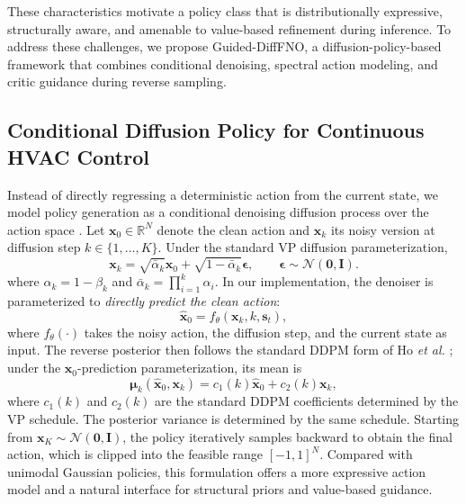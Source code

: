\documentclass[lettersize,journal]{IEEEtran}
\theoremstyle{nonumberplain}     \theoremheaderfont{\bfseries\itshape}     \theorembodyfont{\normalfont}     \theoremseparator{:}     \theoremsymbol{\ensuremath{\blacksquare}}     \newtheorem{proof}{Proof}
\theoremstyle{plain}     \theoremheaderfont{\bfseries\itshape}     \theorembodyfont{\normalfont}     \theoremseparator{:}     \theoremsymbol{\ensuremath{\blacksquare}}     \newtheorem{remark}{Remark}
\begin{document}
These characteristics motivate a policy class that is distributionally expressive, structurally aware, and amenable to value-based refinement during inference. To address these challenges, we propose Guided-DiffFNO, a diffusion-policy-based framework that combines conditional denoising, spectral action modeling, and critic guidance during reverse sampling.

\subsection{Conditional Diffusion Policy for Continuous HVAC Control}

Instead of directly regressing a deterministic action from the current state, we model policy generation as a conditional denoising diffusion process over the action space \cite{ho2020denoising}. Let $\mathbf{x}_0 \in \mathbb{R}^N$ denote the clean action and $\mathbf{x}_k$ its noisy version at diffusion step $k \in \{1,\dots,K\}$. Under the standard VP diffusion parameterization,
\begin{equation}
\mathbf{x}_k
=
\sqrt{\bar{\alpha}_k}\mathbf{x}_0
+
\sqrt{1-\bar{\alpha}_k}\boldsymbol{\epsilon},
\qquad
\boldsymbol{\epsilon}\sim\mathcal{N}(\mathbf{0},\mathbf{I}).
\label{eq:noisy_action}
\end{equation}
where $\alpha_k = 1-\beta_k$ and $\bar{\alpha}_k = \prod_{i=1}^{k}\alpha_i$. In our implementation, the denoiser is parameterized to \emph{directly predict the clean action}:
\begin{equation}
\hat{\mathbf{x}}_0 = f_{\theta}(\mathbf{x}_k,k,\mathbf{s}_t),
\label{eq:x0_prediction}
\end{equation}
where $f_\theta(\cdot)$ takes the noisy action, the diffusion step, and the current state as input. The reverse posterior then follows the standard DDPM form of Ho \emph{et al.} \cite{ho2020denoising}; under the $\mathbf{x}_0$-prediction parameterization, its mean is
\begin{equation}
\boldsymbol{\mu}_k(\hat{\mathbf{x}}_0,\mathbf{x}_k)
=
c_1(k)\hat{\mathbf{x}}_0 + c_2(k)\mathbf{x}_k,
\label{eq:posterior_mean}
\end{equation}
where $c_1(k)$ and $c_2(k)$ are the standard DDPM coefficients determined by the VP schedule. The posterior variance is determined by the same schedule. Starting from $\mathbf{x}_K \sim \mathcal{N}(\mathbf{0},\mathbf{I})$, the policy iteratively samples backward to obtain the final action, which is clipped into the feasible range $[-1,1]^N$. Compared with unimodal Gaussian policies, this formulation offers a more expressive action model and a natural interface for structural priors and value-based guidance.
\end{document}
